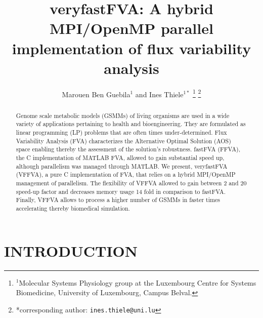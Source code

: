 \documentclass[letterpaper, 10 pt, conference]{ieeeconf}  %
\title{\LARGE \bf
veryfastFVA: A hybrid MPI/OpenMP parallel \\implementation of flux variability analysis
}
\author{Marouen Ben Guebila$^{1}$ and Ines Thiele$^{1*}$%
\thanks{$^{1}$Molecular Systems Physiology group at the Luxembourg Centre for Systems Biomedicine,
        University of Luxembourg, Campus Belval.
        }%
\thanks{*corresponding author: {\tt\small ines.thiele@uni.lu}}
}
\begin{document}
\maketitle
\thispagestyle{empty}
\pagestyle{empty}


\begin{abstract}

Genome scale metabolic models (GSMMs) of living organisms are used in a wide variety of applications pertaining to health and bioengineering. They are formulated as linear programming (LP) problems that are often times under-determined. Flux Variability Analysis (FVA) characterizes the Alternative Optimal Solution (AOS) space enabling thereby the assessment of the solution's robustness. fastFVA (FFVA), the C implementation of MATLAB FVA, allowed to gain substantial speed up, although parallelism was managed through MATLAB. We present, veryfastFVA (VFFVA), a pure C implementation of FVA, that relies on a hybrid MPI/OpenMP management of parallelism. The flexibility of VFFVA allowed to gain between 2 and 20 speed-up factor and decreases memory usage 14 fold in comparison to fastFVA. Finally, VFFVA allows to process a higher number of GSMMs in faster times accelerating thereby biomedical simulation.

\end{abstract}


\section{INTRODUCTION}
\end{document}
